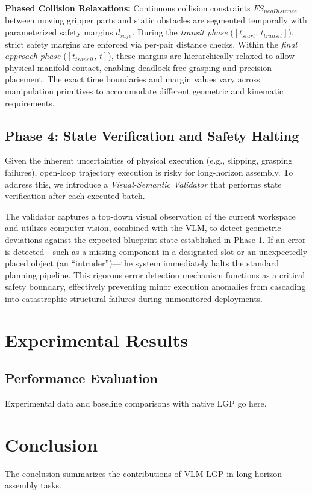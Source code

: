\documentclass[journal]{IEEEtran}
\begin{document}
  \textbf{Phased Collision Relaxations:} Continuous collision constraints
  $FS_{negDistance}$ between moving gripper parts and static obstacles are
  segmented temporally with parameterized safety margins $d_{safe}$. During the
  \textit{transit phase} ($[t_{start},\, t_{transit}]$), strict safety margins are
  enforced via per-pair distance checks. Within the \textit{final approach phase}
  ($[t_{transit},\, t]$), these margins are hierarchically relaxed to allow physical
  manifold contact, enabling deadlock-free grasping and precision placement. The
  exact time boundaries and margin values vary across manipulation primitives to
  accommodate different geometric and kinematic requirements.

  \subsection{Phase 4: State Verification and Safety Halting}
  \label{subsec:phase4} Given the inherent uncertainties of physical execution (e.g.,
  slipping, grasping failures), open-loop trajectory execution is risky for long-horizon
  assembly. To address this, we introduce a \textit{Visual-Semantic Validator} that
  performs state verification after each executed batch.

  The validator captures a top-down visual observation of the current workspace and
  utilizes computer vision, combined with the VLM, to detect geometric deviations
  against the expected blueprint state established in Phase 1. If an error is detected---such
  as a missing component in a designated slot or an unexpectedly placed object (an
  ``intruder'')---the system immediately halts the standard planning pipeline.
  This rigorous error detection mechanism functions as a critical safety boundary, 
  effectively preventing minor execution anomalies from cascading into catastrophic
  structural failures during unmonitored deployments.

  \section{Experimental Results}
  \subsection{Performance Evaluation}
  Experimental data and baseline comparisons with native LGP go here.

  \section{Conclusion}
  The conclusion summarizes the contributions of VLM-LGP in long-horizon
  assembly tasks.
\end{document}
